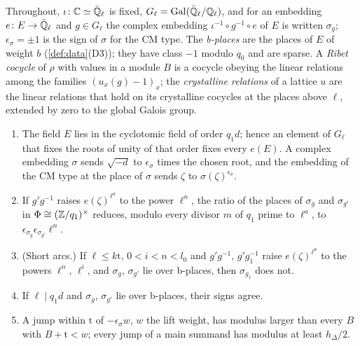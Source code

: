 Throughout, $\iota\colon\mathbb{C}\simeq\bar{\mathbb{Q}}_\ell$ is fixed, $G_\ell=\operatorname{Gal}(\bar{\mathbb{Q}}_\ell/\mathbb{Q}_\ell)$, and for an embedding $e\colon E\to\bar{\mathbb{Q}}_\ell$ and $g\in G_\ell$ the complex embedding $\iota^{-1}\circ g^{-1}\circ e$ of $E$ is written $\sigma_g$; $\epsilon_\sigma=\pm1$ is the sign of $\sigma$ for the
CM type. The \emph{b-places} are the places of $E$ of weight $b$ (\cref{def:data}(D3)); they have class $-1$ modulo $q_0$ and are sparse. A \emph{Ribet cocycle} of $\rho$ with values in a module $B$ is a cocycle obeying the linear relations
among the families $(u_x(g)-1)_x$; the \emph{crystalline relations} of a lattice $u$ are the linear relations that hold on its crystalline cocycles at the places above $\ell$, extended by zero to the global Galois group.

\begin{lemma}\label{lem:b-places}
\begin{enumerate}[label=\textup{(\alph*)}]
\item The field $E$ lies in the cyclotomic field of order $q_1d$; hence an element of $G_\ell$ that fixes the roots of unity of that order fixes every $e(E)$. A complex embedding $\sigma$ sends $\sqrt{-d}$ to $\epsilon_\sigma$ times the chosen root, and the embedding of the CM type at the place of
$\sigma$ sends $\zeta$ to $\sigma(\zeta)^{\epsilon_\sigma}$.
\item If $g'g^{-1}$ raises $e(\zeta)^{\ell^a}$ to the power $\ell^n$, the ratio of the places of $\sigma_g$ and $\sigma_{g'}$ in $\Phi\cong(\mathbb{Z}/q_1)^\times$ reduces, modulo every divisor $m$ of $q_1$ prime to $\ell^a$, to $\epsilon_{\sigma_g}\epsilon_{\sigma_{g'}}\ell^n$.
\item (Short arcs.) If $\ell\le k\mathrm t$, $0<i<n<l_0$ and $g'g^{-1}$, $g'g_1^{-1}$ raise $e(\zeta)^{\ell^a}$ to the powers $\ell^n$, $\ell^i$, and $\sigma_g$, $\sigma_{g'}$ lie over b-places, then $\sigma_{g_1}$ does not.
\item If $\ell\mid q_1d$ and $\sigma_g$, $\sigma_{g'}$ lie over b-places, their signs agree.
\item A jump within $\mathrm t$ of $-\epsilon_\sigma w$, $w$ the lift weight, has modulus larger than every $B$ with $B+\mathrm t<w$; every jump of a main summand has modulus at least $h_\Delta/2$.
\end{enumerate}
\end{lemma}

